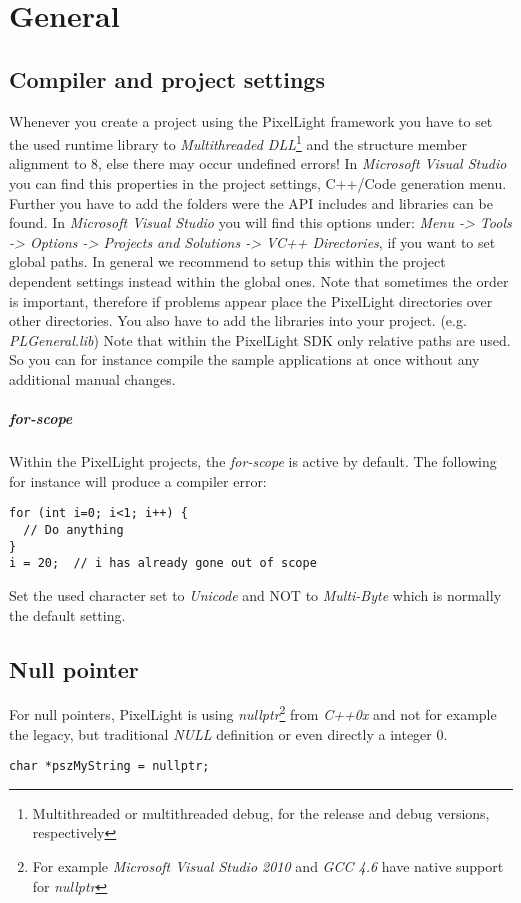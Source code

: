 \chapter{General}




\section{Compiler and project settings}
Whenever you create a project using the PixelLight framework you have to set the used runtime library to \emph{Multithreaded DLL}\footnote{Multithreaded or multithreaded debug, for the release and debug versions, respectively} and the structure member alignment to 8, else there may occur undefined errors! In \emph{Microsoft Visual Studio} you can find this properties in the project settings, C++/Code generation menu. Further you have to add the folders were the API includes and libraries can be found. In \emph{Microsoft Visual Studio} you will find this options under: \emph{Menu -> Tools -> Options -> Projects and Solutions -> VC++ Directories}, if you want to set global paths. In general we recommend to setup this within the project dependent settings instead within the global ones. Note that sometimes the order is important, therefore if problems appear place the PixelLight directories over other directories. You also have to add the libraries into your project. (e.g. \emph{PLGeneral.lib}) Note that within the PixelLight SDK only relative paths are used. So you can for instance compile the sample applications at once without any additional manual changes.


\paragraph{for-scope}
Within the PixelLight projects, the \emph{for-scope} is active by default. The following for instance will produce a compiler error:
\begin{lstlisting}[caption=for-scope]
for (int i=0; i<1; i++) {
  // Do anything
}
i = 20;  // i has already gone out of scope
\end{lstlisting}
Set the used character set to \emph{Unicode} and NOT to \emph{Multi-Byte} which is normally the default setting.




\section{Null pointer}
For null pointers, PixelLight is using \emph{nullptr}\footnote{For example \emph{Microsoft Visual Studio 2010} and \emph{GCC 4.6} have native support for \emph{nullptr}} from \emph{C++0x} and not for example the legacy, but traditional \emph{NULL} definition or even directly a integer 0.
\begin{lstlisting}[caption=Null pointer]
char *pszMyString = nullptr;
\end{lstlisting}




